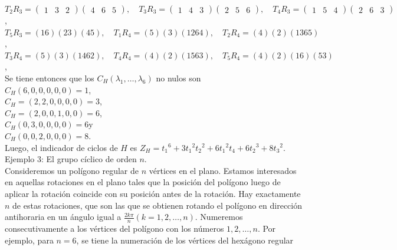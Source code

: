\documentclass[10pt]{article}
\begin{document}
$T_{2} R_{3}=\left(\begin{array}{lll}1 & 3 & 2\end{array}\right)\left(\begin{array}{lll}4 & 6 & 5\end{array}\right), \quad T_{3} R_{3}=\left(\begin{array}{lll}1 & 4 & 3\end{array}\right)\left(\begin{array}{lll}2 & 5 & 6\end{array}\right), \quad T_{4} R_{3}=\left(\begin{array}{lll}1 & 5 & 4\end{array}\right)\left(\begin{array}{lll}2 & 6 & 3\end{array}\right)$,\\
$T_{5} R_{3}=(16)(23)(45), \quad T_{1} R_{4}=(5)(3)(1264), \quad T_{2} R_{4}=(4)(2)(1365)$,\\
$T_{3} R_{4}=(5)(3)(1462), \quad T_{4} R_{4}=(4)(2)(1563), \quad T_{5} R_{4}=(4)(2)(16)(53)$,\\
Se tiene entonces que los $C_{H}\left(\lambda_{1}, \ldots, \lambda_{6}\right)$ no nulos son\\
$C_{H}(6,0,0,0,0,0)=1$,\\
$C_{H}=(2,2,0,0,0,0)=3$,\\
$C_{H}=(2,0,0,1,0,0)=6$,\\
$C_{H}(0,3,0,0,0,0)=6 \mathrm{y}$\\
$C_{H}(0,0,2,0,0,0)=8$.\\
Luego, el indicador de ciclos de $H$ es $Z_{H}=t_{1}{ }^{6}+3 t_{1}{ }^{2} t_{2}{ }^{2}+6 t_{1}{ }^{2} t_{4}+6 t_{2}{ }^{3}+8 t_{3}{ }^{2}$.\\
Ejemplo 3: El grupo cíclico de orden $n$.\\
Consideremos un polígono regular de $n$ vértices en el plano. Estamos interesados en aquellas rotaciones en el plano tales que la posición del polígono luego de aplicar la rotación coincide con su posición antes de la rotación. Hay exactamente $n$ de estas rotaciones, que son las que se obtienen rotando el polígono en dirección antihoraria en un ángulo igual a $\frac{2 k \pi}{n}(k=1,2, \ldots, n)$. Numeremos consecutivamente a los vértices del polígono con los números $1,2, \ldots, n$. Por ejemplo, para $n=6$, se tiene la numeración de los vértices del hexágono regular\\
\end{document}
